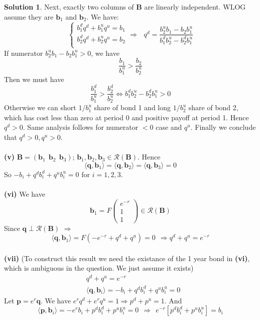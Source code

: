 \documentclass[a4paper, 10pt]{article}
\theoremstyle{definition}
\theoremstyle{hSol}
\newtheorem*{solution}{Solution}
\begin{document}
\begin{solution}
Next, exactly two columns of $\bm{B}$ are linearly independent. WLOG assume they are $\bm{b}_1$ and $\bm{b}_2$. We have:
$$
\begin{cases}
b_1^d q^d + b_1^u q^u = b_1 \\
b_2^d q^d + b_2^u q^u = b_2 \\
\end{cases} \Rightarrow~~~q^d = \frac{b_2^u b_1 - b_2 b_1^u}{b_1^d b_2^u - b_2^d b_1^u}
$$
If numerator $b_2^u b_1 - b_2 b_1^u>0$, we have
$$
\frac{b_1}{b_1^u} > \frac{b_2}{b_2^u}
$$
Then we must have
$$
\frac{b_1^d}{b_1^u} > \frac{b_2^d}{b_2^u} \iff b_1^d b_2^u - b_2^d b_1^u>0
$$
Otherwise we can short $1/b_1^u$ share of bond 1 and long $1/b_2^u$ share of bond 2, which has cost less than zero at period 0 and positive payoff at period 1. Hence $q^d > 0$. Same analysis follows for numerator $<0$ case and $q^u$. Finally we conclude that $q^d >0, q^u>0$.\\
~\\
\textbf{(v)} $\bm{B}=(\bm{b}_1~~\bm{b}_2~~\bm{b}_3)$; $\bm{b}_1, \bm{b}_2, \bm{b}_3 \in \mathcal{R}(\bm{B})$. Hence
$$
\langle \bm{q}, \bm{b}_1 \rangle = \langle \bm{q}, \bm{b}_2 \rangle = \langle \bm{q}, \bm{b}_3 \rangle =0
$$
So $-b_i + q^d b_i^d + q^u b_i^u = 0$ for $i=1,2,3$.\\
~\\
\textbf{(vi)} We have
$$
\bm{b}_1 = F \begin{pmatrix}
  e^{-r}\\
  1\\
  1
\end{pmatrix} \in \mathcal{R}(\bm{B})
$$
Since $\bm{q} \perp \mathcal{R}(\bm{B})$ $\Rightarrow$ 
$$
\langle \bm{q}, \bm{b}_1 \rangle =  F\left( -e^{-r} + q^d + q^u\right) = 0~~\Rightarrow q^d + q^u = e^{-r}
$$
~\\
\textbf{(vii)} (To construct this result we need the existance of the 1 year bond in \textbf{(vi)}, which is ambiguous in the question. We just assume it exists) 
\begin{equation}
\begin{split}
  &q^d + q^u = e^{-r}\\
  &\langle \bm{q}, \bm{b}_i \rangle = -b_i + q^d b_i^d+ q^u b_i^u = 0
\end{split}
\end{equation}
Let $\bm{p} = e^{r}\bm{q}$. We have $e^{r}q^d + e^{r}q^u = 1 \Rightarrow p^d + p^u = 1$. And
\begin{equation}
  \langle \bm{p}, \bm{b}_i \rangle = -e^rb_i + p^d b_i^d+ p^u b_i^u = 0~~\Rightarrow~~ e^{-r}[p^d b_i^d+ p^u b_i^u] = b_i

\end{equation}
\end{solution}
\end{document}
